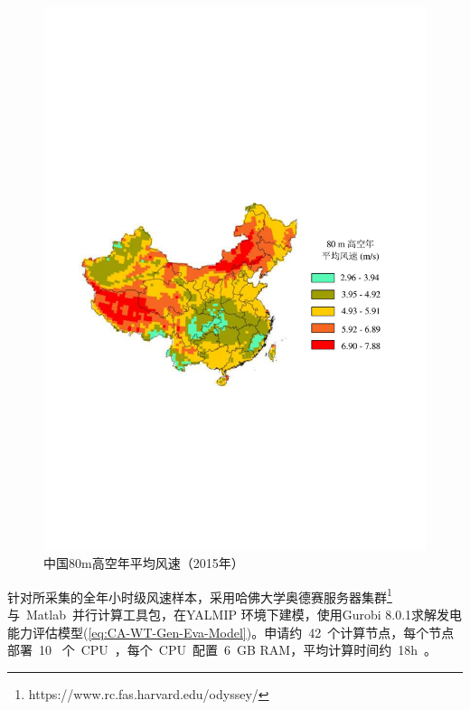 \begin{figure}[!htp] %
  \centering
  \includegraphics[scale=0.75]{figures/Chap5-5-Wind-Speed-80-2.pdf}
  \caption{中国80m高空年平均风速（2015年）}
  \label{fig:wind-speed-80}
\end{figure}


针对所采集的全年小时级风速样本，采用哈佛大学奥德赛服务器集群\footnote{https://www.rc.fas.harvard.edu/odyssey/}与~Matlab~并行计算工具包，在YALMIP\cite{YALMIP} 环境下建模，使用Gurobi 8.0.1求解发电能力评估模型(\ref{eq:CA-WT-Gen-Eva-Model})。申请约~42~个计算节点，每个节点部署~10~ 个~CPU~，每个~CPU~配置~6~GB RAM，平均计算时间约~18h~。

